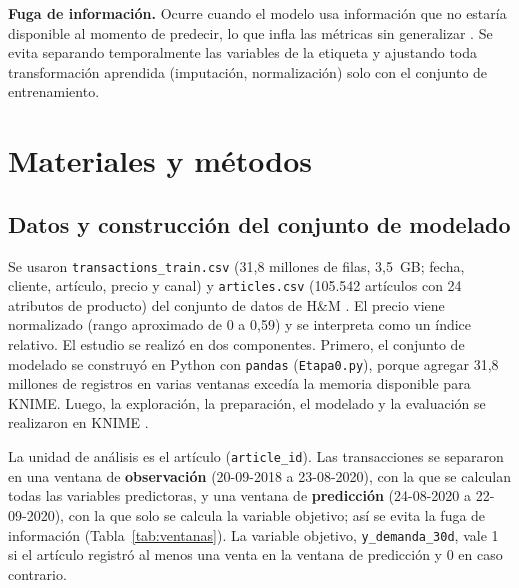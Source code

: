 \documentclass[
  journal=largetwo,
  manuscript=Laboratorio-Numero-02,
  year=2026,
  volume=1
]{cup-journal}
\begin{document}
\textbf{Fuga de información.} Ocurre cuando el modelo usa información que no estaría disponible al momento de predecir, lo que infla las métricas sin generalizar \autocite{kaufman2012leakage}. Se evita separando temporalmente las variables de la etiqueta y ajustando toda transformación aprendida (imputación, normalización) solo con el conjunto de entrenamiento.

\section{Materiales y métodos}

\subsection{Datos y construcción del conjunto de modelado}

Se usaron \texttt{transactions\_train.csv} (31,8 millones de filas, 3,5~GB; fecha, cliente, artículo, precio y canal) y \texttt{articles.csv} (105.542 artículos con 24 atributos de producto) del conjunto de datos de H\&M \autocite{kaggle2022hm}. El precio viene normalizado (rango aproximado de 0 a 0,59) y se interpreta como un índice relativo. El estudio se realizó en dos componentes. Primero, el conjunto de modelado se construyó en Python con \texttt{pandas} (\texttt{Etapa0.py}), porque agregar 31,8 millones de registros en varias ventanas excedía la memoria disponible para KNIME. Luego, la exploración, la preparación, el modelado y la evaluación se realizaron en KNIME \autocite{berthold2009knime}.

La unidad de análisis es el artículo (\texttt{article\_id}). Las transacciones se separaron en una ventana de \textbf{observación} (20-09-2018 a 23-08-2020), con la que se calculan todas las variables predictoras, y una ventana de \textbf{predicción} (24-08-2020 a 22-09-2020), con la que solo se calcula la variable objetivo; así se evita la fuga de información (Tabla~\ref{tab:ventanas}). La variable objetivo, \texttt{y\_demanda\_30d}, vale 1 si el artículo registró al menos una venta en la ventana de predicción y 0 en caso contrario.
\end{document}
